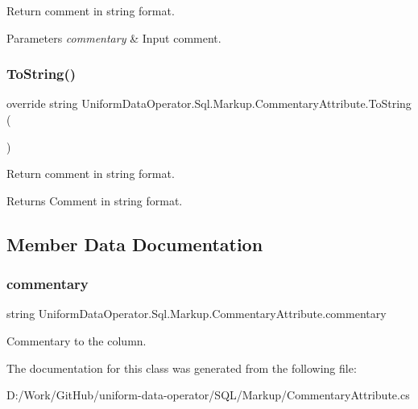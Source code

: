 Return comment in string format. 


\begin{DoxyParams}{Parameters}
{\em commentary} & Input comment.\\
\hline
\end{DoxyParams}
\mbox{\label{class_uniform_data_operator_1_1_sql_1_1_markup_1_1_commentary_attribute_a90440c0a6947fd524fef872cdb7c7683}} 
\subsubsection{\texorpdfstring{To\+String()}{ToString()}}
{\footnotesize\ttfamily override string Uniform\+Data\+Operator.\+Sql.\+Markup.\+Commentary\+Attribute.\+To\+String (\begin{DoxyParamCaption}{ }\end{DoxyParamCaption})}



Return comment in string format. 

\begin{DoxyReturn}{Returns}
Comment in string format.
\end{DoxyReturn}


\subsection{Member Data Documentation}
\mbox{\label{class_uniform_data_operator_1_1_sql_1_1_markup_1_1_commentary_attribute_a729a7d6773b3df9dd31090b1cf8e35b1}} 
\subsubsection{\texorpdfstring{commentary}{commentary}}
{\footnotesize\ttfamily string Uniform\+Data\+Operator.\+Sql.\+Markup.\+Commentary\+Attribute.\+commentary\hspace{0.3cm}{\ttfamily [protected]}}



Commentary to the column. 



The documentation for this class was generated from the following file\+:\begin{DoxyCompactItemize}
\item 
D\+:/\+Work/\+Git\+Hub/uniform-\/data-\/operator/\+S\+Q\+L/\+Markup/Commentary\+Attribute.\+cs\end{DoxyCompactItemize}
